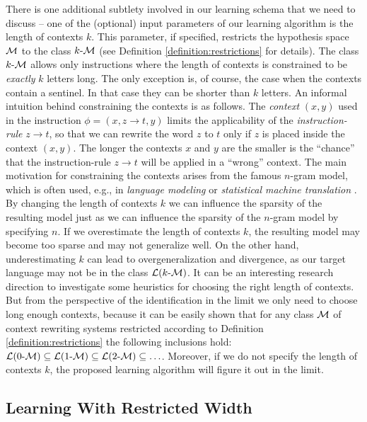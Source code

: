 There is one additional subtlety involved in our learning schema that we need to discuss -- one of the (optional) input parameters of our learning algorithm is the length of contexts $k$. This parameter, if specified, restricts the hypothesis space $\calM$ to the class $\kcalM$ (see Definition \ref{definition:restrictions} for details). The class  $\kcalM$ allows only instructions where the length of contexts is constrained to be \emph{exactly} $k$ letters long. The only exception is, of course, the case when the contexts contain a sentinel. In that case they can be shorter than $k$ letters. An informal intuition behind constraining the contexts is as follows. The \emph{context} $(x, y)$ used in the instruction $\phi = (x, z \to t, y)$ limits the applicability of the \emph{instruction-rule} $z \to t$, so that we can rewrite the word $z$ to $t$ only if $z$ is placed inside the context $(x, y)$. The longer the contexts $x$ and $y$ are the smaller is the ``chance'' that the instruction-rule $z \to t$ will be applied in a ``wrong'' context. The main motivation for constraining the contexts arises from the famous $n$-gram model, which is often used, e.g., in \emph{language modeling} or \emph{statistical machine translation} \cite{Jurafsky}. By changing the length of contexts $k$ we can influence the sparsity of the resulting model just as we can influence the sparsity of the $n$-gram model by specifying $n$. If we overestimate the length of contexts $k$, the resulting model may become too sparse and may not generalize well. On the other hand, underestimating $k$ can lead to overgeneralization and divergence, as our target language may not be in the class $\calL{\kcalM}$. It can be an interesting research direction to investigate some heuristics for choosing the right length of contexts. But from the perspective of the identification in the limit we only need to choose long enough contexts, because it can be easily shown that for any class $\calM$ of context rewriting systems restricted according to Definition \ref{definition:restrictions} the following inclusions hold: $\calL{\kcalM[0]} \subseteq \calL{\kcalM[1]} \subseteq \calL{\kcalM[2]} \subseteq \ldots$. Moreover, if we do not specify the length of contexts $k$, the proposed learning algorithm will figure it out in the limit.

\subsection{Learning With Restricted Width}\label{section:restricted-learning}

